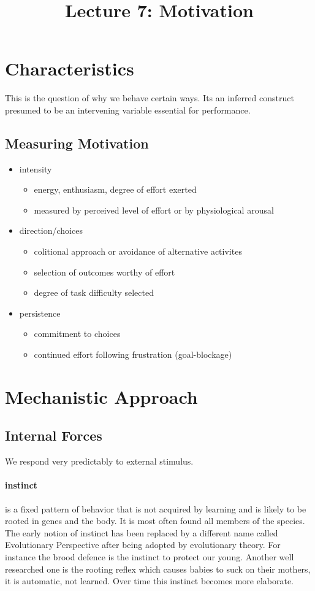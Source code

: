 \documentclass[12pt]{article}
\title{Lecture 7: Motivation}
\begin{document}
\section*{Characteristics}
This is the question of why we behave certain ways. Its an inferred construct presumed to be an intervening variable essential for performance. 
\subsection*{Measuring Motivation}
\begin{itemize}
\item intensity
\begin{itemize}
\item energy, enthusiasm, degree of effort exerted
\item measured by perceived level of effort or by physiological arousal
\end{itemize}
\item direction/choices
\begin{itemize}
\item colitional approach or avoidance of alternative activites
\item selection of outcomes worthy of effort
\item degree of task difficulty selected
\end{itemize}
\item persistence
\begin{itemize}
\item commitment to choices
\item continued effort following frustration (goal-blockage)
\end{itemize}
\end{itemize}
\section*{Mechanistic Approach}
\subsection*{Internal Forces}
We respond very predictably to external stimulus. 
\paragraph*{instinct} is a fixed pattern of behavior that is not acquired by learning and is likely to be rooted in genes and the body. It is most often found all members of the species. The early notion of instinct has been replaced by a different name called Evolutionary Perspective after being adopted by evolutionary theory. For instance the brood defence is the instinct to protect our young. Another well researched one is the rooting reflex which causes babies to suck on their mothers, it is automatic, not learned. Over time this instinct becomes more elaborate. 
\end{document}
